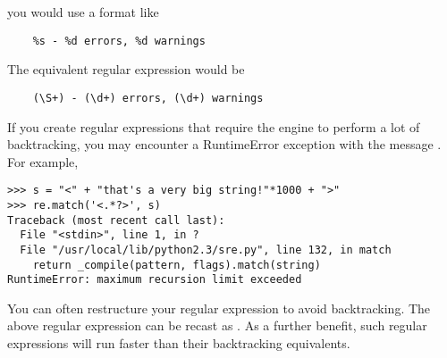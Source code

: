 you would use a  format like

\begin{verbatim}
    %s - %d errors, %d warnings
\end{verbatim}

The equivalent regular expression would be

\begin{verbatim}
    (\S+) - (\d+) errors, (\d+) warnings
\end{verbatim}


If you create regular expressions that require the engine to perform a lot
of backtracking, you may encounter a RuntimeError exception with the message
.  For example,

\begin{verbatim}
>>> s = "<" + "that's a very big string!"*1000 + ">"
>>> re.match('<.*?>', s)
Traceback (most recent call last):
  File "<stdin>", line 1, in ?
  File "/usr/local/lib/python2.3/sre.py", line 132, in match
    return _compile(pattern, flags).match(string)
RuntimeError: maximum recursion limit exceeded
\end{verbatim}

You can often restructure your regular expression to avoid backtracking.
The above regular expression can be recast as
\regexp{\textless[\textasciicircum \textgreater]*\textgreater}.  As a
further benefit, such regular expressions will run faster than their
backtracking equivalents.
